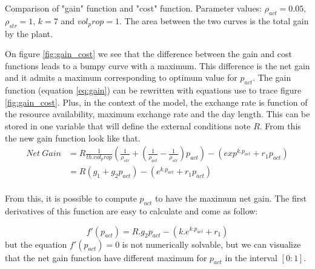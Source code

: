 \documentclass[a4paper, justified,marginals=raggedright]{tufte-handout}
\begin{document}
\begin{marginfigure}[-30mm]
\label{fig:gain_cost}
\caption{Comparison of "gain" function and "cost" function. Parameter values: $\rho_{act} = 0.05$, $\rho_{str} = 1$,  $k = 7$ and  $vol_prop = 1$. The area between the two curves is the total gain by the plant.}
\end{marginfigure}



On figure \ref{fig:gain_cost} we see that the difference between the gain and cost functions leads to a bumpy curve with a maximum. This difference is the net gain and it admits a maximum corresponding to optimum value for $p_{act}$. The gain function (equation \ref{eq:gain}) can be rewritten with equations use to trace figure \ref{fig:gain_cost}. Plus, in the context of the model, the exchange rate is function of the resource availability, maximum exchange rate and the day length. This can be stored in one variable that will define the external conditions note $R$. From this the new gain function look like that.
\begin{align}\label{eq:net_gain}
Net~Gain & = R\frac{1}{th . vol_prop} \left(\frac{1}{\rho_{str}}+\left(\frac{1}{\rho_{act}}-\frac{1}{\rho_{str}}\right)p_{act}\right) - (exp^{k.p_{act}} + r_{1}p_{act})\\
& =R (g_{1} + g_{2}p_{act}) - (e^{k.p_{act}} + r_{1}p_{act}) \\
\end{align}

From this, it is possible to compute $p_{act}$ to have the maximum net gain. The first derivatives of this function are easy to calculate and come as follow:

\begin{equation}\label{eq:net_gain_der}
f'(p_{act}) = R.g_{2}p_{act} - (k.e^{k.p_{act}} + r_{1})
\end{equation}
but the equation $f'(p_{act}) = 0$ is not numerically solvable, but we can visualize that the net gain function have different maximum for $p_{act}$ in the interval $[0:1]$.
\end{document}

